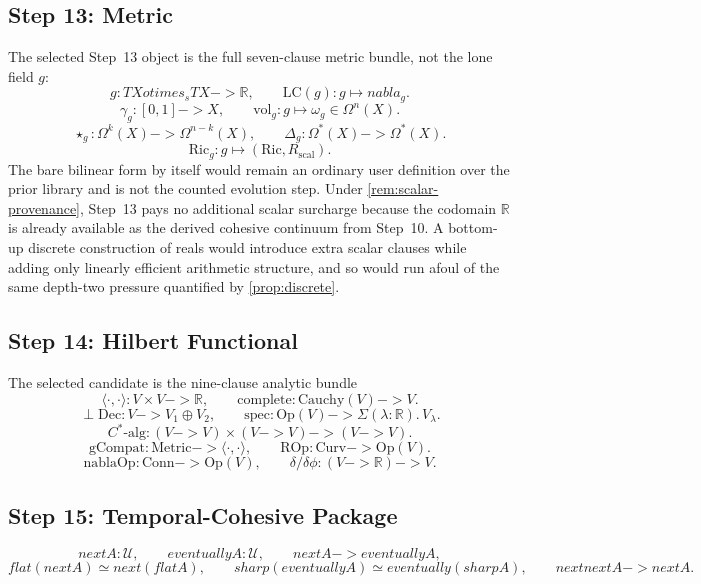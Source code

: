 \documentclass[11pt,a4paper]{article}
\def\to{->}%
\def\otimes{otimes}%
\def\nabla{nabla}%
\def\flat{flat}%
\def\sharp{sharp}%
\def\bigcirc{next}%
\def\Diamond{eventually}%
\theoremstyle{plain}
\theoremstyle{definition}
\theoremstyle{remark}
\newcommand{\R}{\mathbb{R}}
\newcommand{\U}{\mathcal{U}}
\begin{document}
\subsection{Step 13: Metric}

The selected Step~13 object is the full seven-clause metric bundle, not the lone field $g$:
\[
  g:TX\otimes_s TX\to \R,
  \qquad
  \mathrm{LC}(g):g\mapsto \nabla_g.
\]
\[
  \gamma_g:[0,1]\to X,
  \qquad
  \mathrm{vol}_g:g\mapsto \omega_g\in\Omega^n(X).
\]
\[
  \star_g:\Omega^k(X)\to \Omega^{n-k}(X),
  \qquad
  \Delta_g:\Omega^*(X)\to \Omega^*(X).
\]
\[
  \mathrm{Ric}_g:g\mapsto (\mathrm{Ric},R_{\mathrm{scal}}).
\]
The bare bilinear form by itself would remain an ordinary user definition over the prior library and is not the counted evolution step.  Under \cref{rem:scalar-provenance}, Step~13 pays no additional scalar surcharge because the codomain $\R$ is already available as the derived cohesive continuum from Step~10.  A bottom-up discrete construction of reals would introduce extra scalar clauses while adding only linearly efficient arithmetic structure, and so would run afoul of the same depth-two pressure quantified by \cref{prop:discrete}.

\subsection{Step 14: Hilbert Functional}

The selected candidate is the nine-clause analytic bundle
\[
  \langle\cdot,\cdot\rangle:V\times V\to \R,
  \qquad
  \mathrm{complete}:\mathrm{Cauchy}(V)\to V.
\]
\[
  \perp\mathrm{Dec}:V\to V_1\oplus V_2,
  \qquad
  \mathrm{spec}:\mathrm{Op}(V)\to \Sigma(\lambda:\R).\,V_\lambda.
\]
\[
  C^*\text{-alg}:(V\to V)\times (V\to V)\to (V\to V).
\]
\[
  \mathrm{gCompat}:\mathrm{Metric}\to \langle\cdot,\cdot\rangle,
  \qquad
  \mathrm{ROp}:\mathrm{Curv}\to \mathrm{Op}(V).
\]
\[
  \mathrm{nablaOp}:\mathrm{Conn}\to \mathrm{Op}(V),
  \qquad
  \delta/\delta\phi:(V\to \R)\to V.
\]

\subsection{Step 15: Temporal-Cohesive Package}

\[
  \bigcirc A:\U,
  \qquad
  \Diamond A:\U,
  \qquad
  \bigcirc A\to \Diamond A,
\]
\[
  \flat(\bigcirc A)\simeq \bigcirc(\flat A),
  \qquad
  \sharp(\Diamond A)\simeq \Diamond(\sharp A),
  \qquad
  \bigcirc\bigcirc A\to \bigcirc A.
\]
\end{document}
